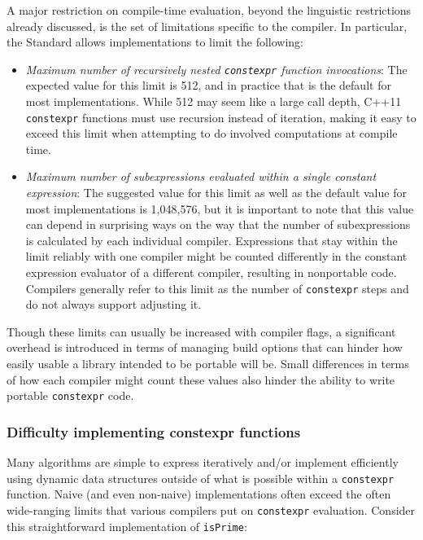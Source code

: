 A major restriction on compile-time evaluation, beyond the linguistic
restrictions already discussed, is the set of
 limitations specific to the compiler. In
particular, the Standard allows implementations to limit the following:

\begin{itemize}
\item{\emph{Maximum number of recursively nested \lstinline!constexpr! function invocations}: The expected value for this limit is 512, and in practice that is the default for most implementations. While 512 may seem like a large call depth, C++11 \lstinline!constexpr! functions must use recursion instead of iteration, making it easy to exceed this limit when attempting to do involved computations at compile time.}
\item{\emph{Maximum number of subexpressions evaluated within a single constant expression}: The suggested value for this limit as well as the default value for most implementations is 1,048,576, but it is important to note that this value can depend in surprising ways on the way that the number of subexpressions is calculated by each individual compiler. Expressions that stay within the limit reliably with one compiler might be counted differently in the constant expression evaluator of a different compiler, resulting in nonportable code. Compilers generally refer to this limit as the number of \lstinline!constexpr! steps and do not always support adjusting it.}
\end{itemize}

Though these limits can usually be increased with compiler flags, a
significant overhead is introduced in terms of managing build options
that can hinder how easily usable a library intended to be portable will
be. Small differences in terms of how each compiler might count these
values also hinder the ability to write portable \lstinline!constexpr!
code.

\subsubsection[Difficulty implementing \lstinline!constexpr! functions]{Difficulty implementing {\SubsubsecCode constexpr} functions}\label{difficulty-implementing-constexpr-functions}

Many algorithms are simple to express iteratively and/or implement
efficiently using dynamic data structures outside of what is possible
within a \lstinline!constexpr! function. Naive (and even non-naive)
implementations often exceed the often wide-ranging limits that various
compilers put on \lstinline!constexpr! evaluation. Consider this
straightforward implementation of \lstinline!isPrime!:

